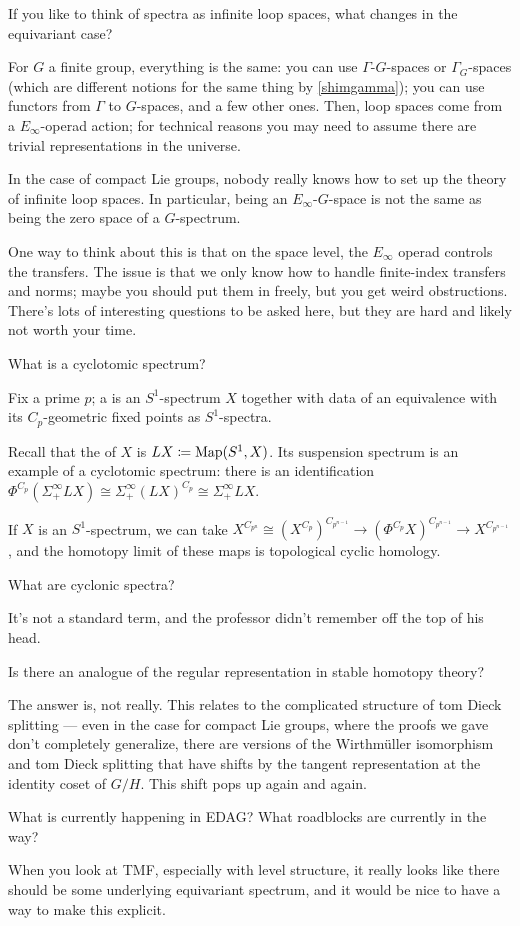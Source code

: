\begin{ques}
If you like to think of spectra as infinite loop spaces, what changes in the equivariant case?
\end{ques}
For $G$ a finite group, everything is the same: you can use $\Gamma$-$G$-spaces or $\Gamma_G$-spaces (which are
different notions for the same thing by \cref{shimgamma}); you can use functors from $\Gamma$ to $G$-spaces, and a
few other ones.  Then, loop spaces come from a $E_\infty$-operad action; for technical reasons you may need to
assume there are trivial representations in the universe.

In the case of compact Lie groups, nobody really knows how to set up the theory of infinite loop spaces. In
particular, being an $E_\infty$-$G$-space is not the same as being the zero space of a $G$-spectrum.

One way to think about this is that on the space level, the $E_\infty$ operad controls the transfers. The issue is
that we only know how to handle finite-index transfers and norms; maybe you should put them in freely, but you get
weird obstructions. There's lots of interesting questions to be asked here, but they are hard and likely not worth
your time.
\begin{ques}
What is a cyclotomic spectrum?
\end{ques}
Fix a prime $p$; a  is an $S^1$-spectrum $X$ together with data of an equivalence
with its $C_p$-geometric fixed points as $S^1$-spectra.

Recall that the  of $X$ is $LX\coloneqq\operatorname{Map}(S^1,X)$. Its suspension spectrum is an example of a
cyclotomic spectrum: there is an identification $\Phi^{C_p}(\Sigma_+^\infty LX)\cong\Sigma_+^\infty (LX)^{C_p}\cong
\Sigma_+^\infty LX$.

If $X$ is an $S^1$-spectrum, we can take $X^{C_{p^n}}\cong (X^{C_p})^{C_{p^{n-1}}}\to (\Phi^{C_p}
X)^{C_{p^{n-1}}}\to X^{C_{p^{n-1}}}$, and the homotopy limit of these maps is topological cyclic homology.
\begin{ques}
What are cyclonic spectra?
\end{ques}
It's not a standard term, and the professor didn't remember off the top of his head.
\begin{ques}
Is there an analogue of the regular representation in stable homotopy theory?
\end{ques}
The answer is, not really. This relates to the complicated structure of tom Dieck splitting --- even in the case
for compact Lie groups, where the proofs we gave don't completely generalize, there are versions of the
Wirthmüller isomorphism and tom Dieck splitting that have shifts by the tangent representation at the identity
coset of $G/H$. This shift pops up again and again.
\begin{ques}
What is currently happening in EDAG? What roadblocks are currently in the way?
\end{ques}
When you look at TMF, especially with level structure, it really looks like there should be some underlying
equivariant spectrum, and it would be nice to have a way to make this explicit.

